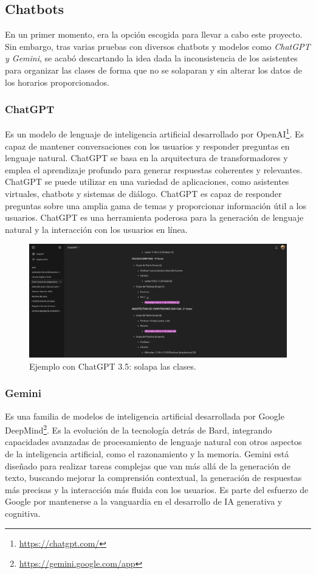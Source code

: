 \subsection{Chatbots}
En un primer momento, era la opción escogida para llevar a cabo este proyecto. Sin embargo, tras varias pruebas con diversos chatbots y modelos como \emph{ChatGPT y Gemini}, se acabó descartando la idea dada la inconsistencia de los asistentes para organizar las clases de forma que no se solaparan y sin alterar los datos de los horarios proporcionados.

\subsubsection*{ChatGPT}
Es un modelo de lenguaje de inteligencia artificial desarrollado por OpenAI\footnote{\url{https://chatgpt.com/}}. Es capaz de mantener conversaciones con los usuarios y responder preguntas en lenguaje natural. ChatGPT se basa en la arquitectura de transformadores y emplea el aprendizaje profundo para generar respuestas coherentes y relevantes. ChatGPT se puede utilizar en una variedad de aplicaciones, como asistentes virtuales, chatbots y sistemas de diálogo. ChatGPT es capaz de responder preguntas sobre una amplia gama de temas y proporcionar información útil a los usuarios. ChatGPT es una herramienta poderosa para la generación de lenguaje natural y la interacción con los usuarios en línea.


    \begin{figure}[H]
        \centering
        \includegraphics[width=1\textwidth]{./imagenes/ChatGPT.png}
        \caption{Ejemplo con ChatGPT 3.5: solapa las clases.}
    \end{figure}


\subsubsection*{Gemini}
Es una familia de modelos de inteligencia artificial desarrollada por Google DeepMind\footnote{\url{https://gemini.google.com/app}}. Es la evolución de la tecnología detrás de Bard, integrando capacidades avanzadas de procesamiento de lenguaje natural con otros aspectos de la inteligencia artificial, como el razonamiento y la memoria. Gemini está diseñado para realizar tareas complejas que van más allá de la generación de texto, buscando mejorar la comprensión contextual, la generación de respuestas más precisas y la interacción más fluida con los usuarios. Es parte del esfuerzo de Google por mantenerse a la vanguardia en el desarrollo de IA generativa y cognitiva.


